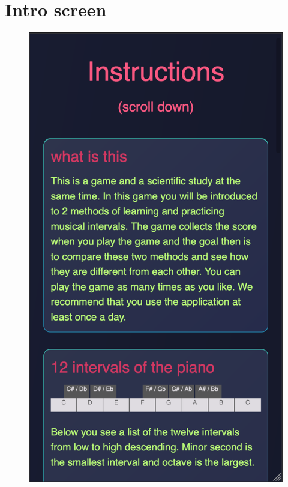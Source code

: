 \section{Intro screen}
\begin{figure}[H]
\centering
\includegraphics[scale=.33]{Parts/Fig/intro.png}
\vspace*{-5mm}
\end{figure}



